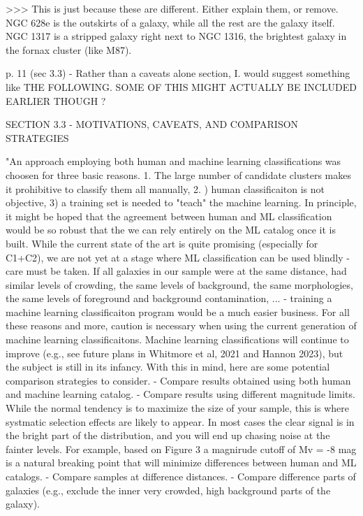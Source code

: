 >>> This is just because these are different. Either explain them, or remove. NGC 628e is the outskirts of a galaxy, while all the rest are the galaxy itself. NGC 1317 is a stripped galaxy right next to NGC 1316, the brightest galaxy in the fornax cluster (like M87).
 
 
p. 11 (sec 3.3) - Rather than a caveats alone section, I. would suggest something like THE FOLLOWING. SOME OF THIS MIGHT ACTUALLY BE INCLUDED EARLIER THOUGH ?
 
SECTION 3.3 - MOTIVATIONS, CAVEATS, AND COMPARISON STRATEGIES
 
"An approach employing both human and machine learning classifications was choosen for three basic reasons. 1. The large number of candidate clusters makes it prohibitive to classify them all manually, 2. ) human classificaiton is not objective, 3) a training set is needed to "teach" the machine learning. In principle, it might be hoped that the agreement between human and ML classification would be so robust that the we can rely entirely on the ML catalog once it is built. While the current state of the art is quite promising (especially for C1+C2), we are not yet at a stage where  ML classification can be used blindly - care  must be taken.
If all galaxies in our sample were at the same distance, had similar levels of crowding, the same levels of background, the same morphologies, the same levels of foreground and background contamination, ... -  training a machine learning classificaiton program would be a much easier business. For all these reasons  and more, caution is necessary when using the current generation of machine learning classificaitons. Machine learning classifications will continue to improve (e.g., see future plans in Whitmore et al, 2021 and Hannon 2023), but the subject is still in its infancy.
With this in mind, here are some potential comparison strategies to consider.
- Compare results obtained using both human and machine learning catalog.
- Compare results using different magnitude limits. While the normal tendency is to maximize the size of your sample, this is where systmatic selection effects are likely to appear. In most cases the clear signal is in the bright part of the distribution, and you will end up chasing noise at the fainter levels. For example, based on Figure 3 a magnirude cutoff of Mv = -8 mag is a natural breaking point that will minimize differences between human and ML catalogs.
- Compare samples at difference distances.
- Compare difference parts of galaxies (e.g., exclude the inner very crowded, high background parts of the galaxy).
